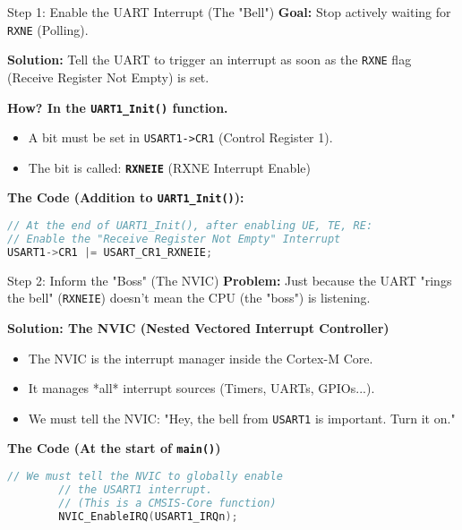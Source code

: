 \documentclass{beamer}
\begin{document}
\begin{frame}[fragile]{Step 1: Enable the UART Interrupt (The "Bell")}
\textbf{Goal:} Stop actively waiting for \texttt{RXNE} (Polling).

\medskip
\textbf{Solution:} Tell the UART to trigger an interrupt as soon as the \texttt{RXNE} flag (Receive Register Not Empty) is set.

\bigskip
\textbf{How? In the \texttt{UART1\_Init()} function.}
\begin{itemize}
\item A bit must be set in \texttt{USART1->CR1} (Control Register 1).
\item The bit is called: \textbf{\texttt{RXNEIE}} (RXNE Interrupt Enable)
\end{itemize}

\bigskip
\textbf{The Code (Addition to \texttt{UART1\_Init()}):}
\begin{lstlisting}[language=C, style=mystyle]
// At the end of UART1_Init(), after enabling UE, TE, RE:
// Enable the "Receive Register Not Empty" Interrupt
USART1->CR1 |= USART_CR1_RXNEIE;
\end{lstlisting}
\end{frame}
\begin{frame}[fragile]{Step 2: Inform the "Boss" (The NVIC)}
	\textbf{Problem:} Just because the UART "rings the bell" (\texttt{RXNEIE}) doesn't mean the CPU (the "boss") is listening.
	
	\medskip
	\textbf{Solution: The NVIC (Nested Vectored Interrupt Controller)}
	\begin{itemize}
		\item The NVIC is the interrupt manager inside the Cortex-M Core.
		\item It manages *all* interrupt sources (Timers, UARTs, GPIOs...).
		\item We must tell the NVIC: "Hey, the bell from \texttt{USART1} is important. Turn it on."
	\end{itemize}
	
	\bigskip
	\textbf{The Code (At the start of \texttt{main()})}
	\begin{lstlisting}[language=C, style=mystyle]
		// We must tell the NVIC to globally enable
		// the USART1 interrupt.
		// (This is a CMSIS-Core function)
		NVIC_EnableIRQ(USART1_IRQn);
	\end{lstlisting}
\end{frame}
\end{document}
